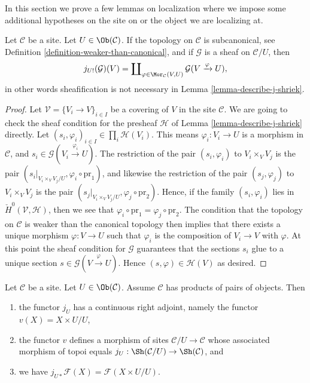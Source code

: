\noindent
In this section we prove a few lemmas on localization where we
impose some additional hypotheses on the site on or the object
we are localizing at.

\begin{lemma}
\label{lemma-describe-j-shriek-good-site}
Let $\mathcal{C}$ be a site.
Let $U \in \Ob(\mathcal{C})$.
If the topology on $\mathcal{C}$ is subcanonical, see
Definition \ref{definition-weaker-than-canonical},
and if $\mathcal{G}$ is a sheaf on $\mathcal{C}/U$, then
$$
j_{U!}(\mathcal{G})(V)
=
\coprod\nolimits_{\varphi \in \Mor_\mathcal{C}(V, U)}
\mathcal{G}(V \xrightarrow{\varphi} U),
$$
in other words sheafification is not necessary in
Lemma \ref{lemma-describe-j-shriek}.
\end{lemma}

\begin{proof}
Let $\mathcal{V} = \{V_i \to V\}_{i \in I}$ be a covering of $V$
in the site $\mathcal{C}$.
We are going to check the sheaf condition for the presheaf $\mathcal{H}$
of Lemma \ref{lemma-describe-j-shriek} directly.
Let $(s_i, \varphi_i)_{i \in I} \in \prod_i \mathcal{H}(V_i)$.
This means $\varphi_i : V_i \to U$ is a morphism in $\mathcal{C}$, and
$s_i \in \mathcal{G}(V_i \xrightarrow{\varphi_i} U)$.
The restriction of the pair $(s_i, \varphi_i)$ to
$V_i \times_V V_j$ is the pair
$(s_i|_{V_i \times_V V_j/U}, \varphi_i \circ \text{pr}_1)$, and
likewise the restriction of the pair $(s_j, \varphi_j)$ to
$V_i \times_V V_j$ is the pair
$(s_j|_{V_i \times_V V_j/U}, \varphi_j \circ \text{pr}_2)$.
Hence, if the family $(s_i, \varphi_i)$ lies in
$\check{H}^0(\mathcal{V}, \mathcal{H})$, then we see that
$\varphi_i \circ \text{pr}_1 = \varphi_j \circ \text{pr}_2$.
The condition that the topology on $\mathcal{C}$ is weaker than the canonical
topology then implies that there exists a unique morphism
$\varphi : V \to U$ such that $\varphi_i$ is the composition
of $V_i \to V$ with $\varphi$. At this point the sheaf condition for
$\mathcal{G}$ guarantees that the sections $s_i$ glue to a unique
section $s \in \mathcal{G}(V \xrightarrow{\varphi} U)$.
Hence $(s, \varphi) \in \mathcal{H}(V)$ as desired.
\end{proof}

\begin{lemma}
\label{lemma-localize-given-products}
Let $\mathcal{C}$ be a site.
Let $U \in \Ob(\mathcal{C})$.
Assume $\mathcal{C}$ has products of pairs of objects.
Then
\begin{enumerate}
\item the functor $j_U$ has a continuous right adjoint,
namely the functor $v(X) = X \times U / U$,
\item the functor $v$ defines a morphism of sites
$\mathcal{C}/U \to \mathcal{C}$ whose associated morphism of topoi equals
$j_U : \Sh(\mathcal{C}/U) \to \Sh(\mathcal{C})$, and
\item we have $j_{U*}\mathcal{F}(X) = \mathcal{F}(X \times U/U)$.
\end{enumerate}
\end{lemma}

